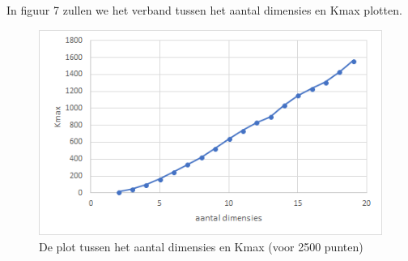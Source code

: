 \documentclass[12pt]{article}
\begin{document}
In figuur 7 zullen we het verband tussen het aantal dimensies en Kmax plotten.



\begin{figure}
\includegraphics[width=\textwidth]{dim-Kmax.png}
\caption{De plot tussen het aantal dimensies en Kmax (voor 2500 punten)}
\end{figure}
\end{document}
